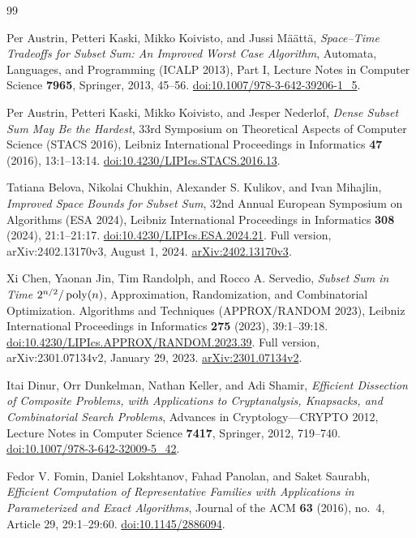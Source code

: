 \begin{thebibliography}{99}
\raggedright

Per Austrin, Petteri Kaski, Mikko Koivisto, and Jussi M\"a\"att\"a,
\emph{Space--Time Tradeoffs for Subset Sum: An Improved Worst Case Algorithm},
Automata, Languages, and Programming (ICALP 2013), Part I,
Lecture Notes in Computer Science \textbf{7965}, Springer, 2013, 45--56.
\href{https://doi.org/10.1007/978-3-642-39206-1_5}
{doi:10.1007/978-3-642-39206-1\_5}.

Per Austrin, Petteri Kaski, Mikko Koivisto, and Jesper Nederlof,
\emph{Dense Subset Sum May Be the Hardest},
33rd Symposium on Theoretical Aspects of Computer Science (STACS 2016),
Leibniz International Proceedings in Informatics \textbf{47}
(2016), 13:1--13:14.
\href{https://doi.org/10.4230/LIPIcs.STACS.2016.13}
{doi:10.4230/LIPIcs.STACS.2016.13}.

Tatiana Belova, Nikolai Chukhin, Alexander S. Kulikov, and Ivan Mihajlin,
\emph{Improved Space Bounds for Subset Sum},
32nd Annual European Symposium on Algorithms (ESA 2024),
Leibniz International Proceedings in Informatics \textbf{308}
(2024), 21:1--21:17.
\href{https://doi.org/10.4230/LIPIcs.ESA.2024.21}
{doi:10.4230/LIPIcs.ESA.2024.21}.
Full version, arXiv:2402.13170v3, August 1, 2024.
\href{https://arxiv.org/abs/2402.13170v3}{arXiv:2402.13170v3}.

Xi Chen, Yaonan Jin, Tim Randolph, and Rocco A. Servedio,
\emph{Subset Sum in Time $2^{n/2}/\operatorname{poly}(n)$},
Approximation, Randomization, and Combinatorial Optimization.
Algorithms and Techniques (APPROX/RANDOM 2023),
Leibniz International Proceedings in Informatics \textbf{275}
(2023), 39:1--39:18.
\href{https://doi.org/10.4230/LIPIcs.APPROX/RANDOM.2023.39}
{doi:10.4230/LIPIcs.APPROX/RANDOM.2023.39}.
Full version, arXiv:2301.07134v2, January 29, 2023.
\href{https://arxiv.org/abs/2301.07134v2}{arXiv:2301.07134v2}.

Itai Dinur, Orr Dunkelman, Nathan Keller, and Adi Shamir,
\emph{Efficient Dissection of Composite Problems, with Applications to
Cryptanalysis, Knapsacks, and Combinatorial Search Problems},
Advances in Cryptology---CRYPTO 2012,
Lecture Notes in Computer Science \textbf{7417}, Springer, 2012, 719--740.
\href{https://doi.org/10.1007/978-3-642-32009-5_42}
{doi:10.1007/978-3-642-32009-5\_42}.

Fedor V. Fomin, Daniel Lokshtanov, Fahad Panolan, and Saket Saurabh,
\emph{Efficient Computation of Representative Families with Applications
in Parameterized and Exact Algorithms},
Journal of the ACM \textbf{63} (2016), no.~4,
Article 29, 29:1--29:60.
\href{https://doi.org/10.1145/2886094}{doi:10.1145/2886094}.


\end{thebibliography}
